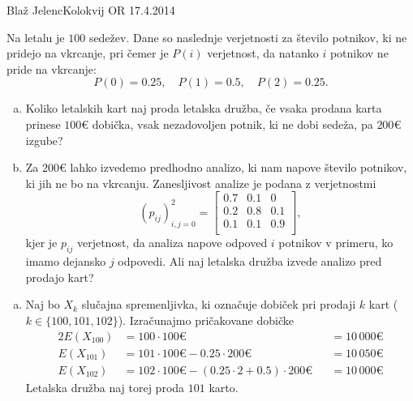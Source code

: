 \begin{naloga}{Blaž Jelenc}{Kolokvij OR 17.4.2014}
\begin{vprasanje}
Na letalu je $100$ sedežev.
Dane so naslednje verjetnosti za število potnikov,
ki ne pridejo na vkrcanje,
pri čemer je $P(i)$ verjetnost, da natanko $i$ potnikov ne pride na vkrcanje:
$$
P(0) = 0.25, \quad P(1) = 0.5, \quad P(2) = 0.25 .
$$
\begin{enumerate}[(a)]
\item Koliko letalskih kart naj proda letalska družba,
če vsaka prodana karta prinese $100 €$ dobička,
vsak nezadovoljen potnik, ki ne dobi sedeža, pa $200 €$ izgube?

\item Za $200 €$ lahko izvedemo predhodno analizo,
ki nam napove število potnikov, ki jih ne bo na vkrcanju.
Zanesljivost analize je podana z verjetnostmi
$$
(p_{ij})_{i,j=0}^2 = \begin{bmatrix}
0.7 & 0.1 & 0 \\
0.2 & 0.8 & 0.1 \\
0.1 & 0.1 & 0.9 \\
\end{bmatrix} ,
$$
kjer je $p_{ij}$ verjetnost,
da analiza napove odpoved $i$ potnikov v primeru,
ko imamo dejansko $j$ odpovedi.
Ali naj letalska družba izvede analizo pred prodajo kart?
\end{enumerate}
\end{vprasanje}

\begin{odgovor}
\begin{enumerate}[(a)]
\item Naj bo $X_k$ slučajna spremenljivka,
ki označuje dobiček pri prodaji $k$ kart ($k \in \{100, 101, 102\}$).
Izračunajmo pričakovane dobičke
\begin{alignat*}{2}
E(X_{100}) &= 100 \cdot 100 € &&= 10\,000 € \\
E(X_{101}) &= 101 \cdot 100 € - 0.25 \cdot 200 € &&= 10\,050 € \\
E(X_{102}) &= 102 \cdot 100 € - (0.25 \cdot 2 + 0.5) \cdot 200 € &&= 10\,000 €
\end{alignat*}
Letalska družba naj torej proda $101$ karto.


\end{enumerate}
\end{odgovor}
\end{naloga}
